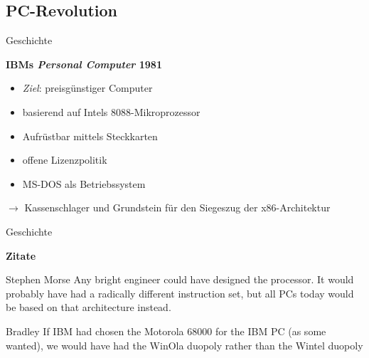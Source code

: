 \subsection{PC-Revolution}
\begin{frame}{Geschichte}
	\begin{center}
		\textbf{IBMs \textit{Personal Computer}	1981}
	\end{center}

	\begin{itemize}
		\item \emph{Ziel}: preisgünstiger Computer
		\item basierend auf Intels 8088-Mikroprozessor
		\item Aufrüstbar mittels Steckkarten
		\item offene Lizenzpolitik
		\item MS-DOS als Betriebssystem
	\end{itemize}

	$\rightarrow$ Kassenschlager und Grundstein für den Siegeszug der x86-Architektur 
\end{frame}

\begin{frame}{Geschichte}
	\begin{center}
		\textbf{Zitate}
	\end{center}

	\begin{block}{Stephen Morse}
		Any bright engineer could have designed the processor. It would probably have had a radically different instruction set, but all PCs today would be based on that architecture instead.
	\end{block}

	\pause

	\begin{block}{Bradley}
		If IBM had chosen the Motorola 68000 for the IBM PC (as some wanted), we would have had the WinOla duopoly rather than the Wintel duopoly
	\end{block}
\end{frame}
